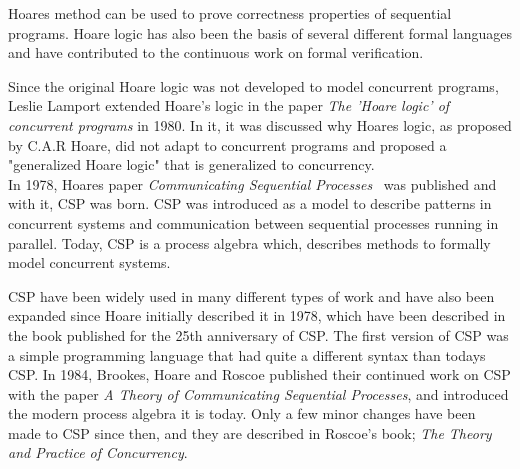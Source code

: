 Hoares method can be used to prove correctness properties of sequential programs. Hoare logic has also been the basis of several different formal languages and have contributed to the continuous work on formal verification.

Since the original Hoare logic was not developed to model concurrent programs, Leslie Lamport extended Hoare's logic in the paper \textit{The 'Hoare logic' of concurrent programs}\cite{Lamport1980} in 1980. In it, it was discussed why Hoares logic, as proposed by C.A.R Hoare, did not adapt to concurrent programs and proposed a "generalized Hoare logic" that is generalized to concurrency. \\

In 1978, Hoares paper \textit{Communicating Sequential Processes}~\cite{Hoare1978} was published and with it, CSP was born.
CSP was introduced as a model to describe patterns in concurrent systems and communication between sequential processes running in parallel. Today, CSP is a process algebra which, describes methods to formally model concurrent systems.

CSP have been widely used in many different types of work and have also been expanded since Hoare initially described it in 1978, which have been described in the book\cite{Abdallah2005} published for the 25th anniversary of CSP.
The first version of CSP was a simple programming language that had quite a different syntax than todays CSP. In 1984, Brookes, Hoare and Roscoe published their continued work on CSP with the paper \textit{A Theory of Communicating Sequential Processes}\cite{Brookes1984}, and introduced the modern process algebra it is today. Only a few minor changes have been made to CSP since then, and they are described in Roscoe's book; \textit{The Theory and Practice of Concurrency}\cite{Roscoe1997}.\\

